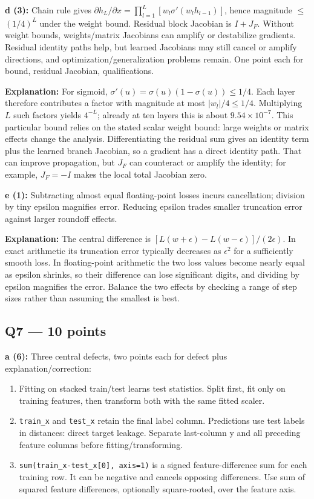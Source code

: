 \documentclass[11pt]{article}
\begin{document}
\textbf{d (3):} Chain rule gives $\partial h_L/\partial x=\prod_{l=1}^L[w_l\sigma'(w_lh_{l-1})]$, hence magnitude \ensuremath{\le}$(1/4)^L$ under the weight bound. Residual block Jacobian is $I+J_F$. Without weight bounds, weights/\allowbreak{}matrix Jacobians can amplify or destabilize gradients. Residual identity paths help, but learned Jacobians may still cancel or amplify directions, and optimization/\allowbreak{}generalization problems remain. One point each for bound, residual Jacobian, qualifications.

\textbf{Explanation:} For sigmoid, $\sigma'(u)=\sigma(u)(1-\sigma(u))\le1/4$. Each layer therefore contributes a factor with magnitude at most $|w_l|/4\le1/4$. Multiplying $L$ such factors yields $4^{-L}$; already at ten layers this is about $9.54\times10^{-7}$. This particular bound relies on the stated scalar weight bound: large weights or matrix effects change the analysis. Differentiating the residual sum gives an identity term plus the learned branch Jacobian, so a gradient has a direct identity path. That can improve propagation, but $J_F$ can counteract or amplify the identity; for example, $J_F=-I$ makes the local total Jacobian zero.

\textbf{e (1):} Subtracting almost equal floating-point losses incurs cancellation; division by tiny epsilon magnifies error. Reducing epsilon trades smaller truncation error against larger roundoff effects.

\textbf{Explanation:} The central difference is $[L(w+\epsilon)-L(w-\epsilon)]/(2\epsilon)$. In exact arithmetic its truncation error typically decreases as $\epsilon^2$ for a sufficiently smooth loss. In floating-point arithmetic the two loss values become nearly equal as epsilon shrinks, so their difference can lose significant digits, and dividing by epsilon magnifies the error. Balance the two effects by checking a range of step sizes rather than assuming the smallest is best.


\subsection*{Q7 — 10 points}

\textbf{a (6):} Three central defects, two points each for defect plus explanation/\allowbreak{}correction:

\begin{enumerate}
\item Fitting on stacked train/\allowbreak{}test learns test statistics. Split first, fit only on training features, then transform both with the same fitted scaler.
\item \texttt{train\_x} and \texttt{test\_x} retain the final label column. Predictions use test labels in distances: direct target leakage. Separate last-column y and all preceding feature columns before fitting/\allowbreak{}transforming.
\item \texttt{sum(train\_x-test\_x[0], axis=1)} is a signed feature-difference sum for each training row. It can be negative and cancels opposing differences. Use sum of squared feature differences, optionally square-rooted, over the feature axis.
\end{enumerate}
\end{document}
